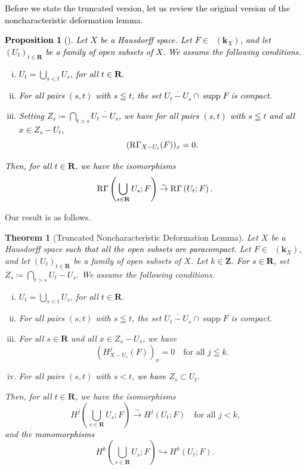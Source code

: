 ﻿\documentclass[a4paper,leqno,dvipdfmx]{jsarticle}
\newtheorem{Theorem+}[Axiom+]{Theorem}
\newtheorem{Proposition+}[Axiom+]{Proposition}
\theoremstyle{definition}
\newcommand{\zz}{\mathbf{Z}}
\newcommand{\rr}{\mathbf{R}}
\newcommand{\kk}{\mathbf{k}}
\numberwithin{equation}{section}
\newcommand{\supp}{\mathop{\mathrm{supp}}\nolimits}
\newcommand{\Dompl}{\mathop{\mathsf{D}^\mathrm{+}}\nolimits}
\newcommand{\RG}{\mathop{\mathrm{R}\hspace{-0pt}\Gamma}\nolimits}
\newcommand{\simar}{\mathrel{\overset{\sim}{\rightarrow}}}%
\theoremstyle{mystyle}
\newcommand{\smi}{-}
\begin{document}
\textcolor{black}{
Before we state the truncated version, let us review the original 
version of the noncharacteristic deformation lemma.   
\begin{Proposition+}[{\cite[Proposition 2.7.2]{KS90}}]\label{prp:nonchar}
  Let \(X\) be a Hausdorff space. 
  Let \(F\in\Dompl(\kk_X)\), and let
  \(\left(U_{t}\right)_{t\in\rr}\) be a family of 
  open subsets of \(X\). 
  We assume the following conditions. 
  \begin{enumerate}[(i)]
    \item \label{item:nonchar1}
    \(U_{t}=\bigcup_{s<t}U_{s}\), for all \(t\in\rr\). 
    \item \label{item:nonchar2}
    For all pairs \((s,t)\) with \(s\leqq t\), 
    the set \(\overline{U_{t}\smi U_{s}}\cap \supp{F}\) is compact.
    \item \label{item:nonchar3}
    Setting \(
      Z_{s}\coloneqq \bigcap_{t>s}\overline{U_t\smi U_s}
    \), we have
    for all pairs \((s,t)\) with \(s\leqq t\) and 
    all \(x\in Z_{s}\smi U_{t}\), 
    \[
      (\RG_{X\smi U_{t}}(F))_{x}=0.
    \]
  \end{enumerate}
  Then, for all \(t\in\rr\), we have the isomorphisms\[
    \RG\left(\bigcup_{s\in\rr}U_{s};F\right)
    \simar 
    \RG\left(U_{t};F\right).
  \]
\end{Proposition+}
}

Our result is as follows. 

\begin{Theorem+}[Truncated Noncharacteristic Deformation Lemma]\label{prp:t-nonchar}
  Let \(X\) be a Hausdorff space 
  \textcolor{black}{such that 
  all the open subsets are paracompact}. 
  Let \(F\in\Dompl(\kk_X)\), and let
  \(\left(U_{t}\right)_{t\in\rr}\) be a family of 
  open subsets of \(X\). 
  Let \(k\in\zz\). 
  \textcolor{black}{For \(s\in\rr\)}, set \(
    Z_{s}\coloneqq \bigcap_{t>s}\overline{U_t\smi U_s}
  \). 
  We assume the following conditions. 
  \begin{enumerate}[(i)]
    \item \label{item:t-nonchar1}
    \(U_{t}=\bigcup_{s<t}U_{s}\), for all \(t\in\rr\). 
    \item \label{item:t-nonchar2}
    For all pairs \((s,t)\) with \(s\leqq t\), 
    the set \(\overline{U_{t}\smi U_{s}}\cap \supp{F}\) is compact.
    \item \label{item:t-nonchar3}
    For all \(s\in\rr\) and all \(x\in Z_{s}\smi U_{s}\), 
    we have\[
      (H^{j}_{X\smi U_{s}}(F))_{x}=0
      \quad 
      \text{for all \(j\leqq k\).}
    \]
    \item \label{item:t-nonchar4} 
    For all pairs \((s,t)\) with \(s< t\), \textcolor{black}{we have} \(Z_s\subset U_{t}\).
  \end{enumerate}
  Then, for all \(t\in\rr\), we have the isomorphisms\[
    H^{j}\left(\bigcup_{s\in\rr}U_{s};F\right)
    \simar 
    H^{j}\left(U_{t};F\right)
    \quad \text{for all \(j< k\),} 
  \]
  and the \textcolor{black}{monomorphisms} \[
    H^{k}\left(\bigcup_{s\in\rr}U_{s};F\right)
    \hookrightarrow 
    H^{k}\left(U_{t};F\right).
  \] 
\end{Theorem+}
\end{document}
